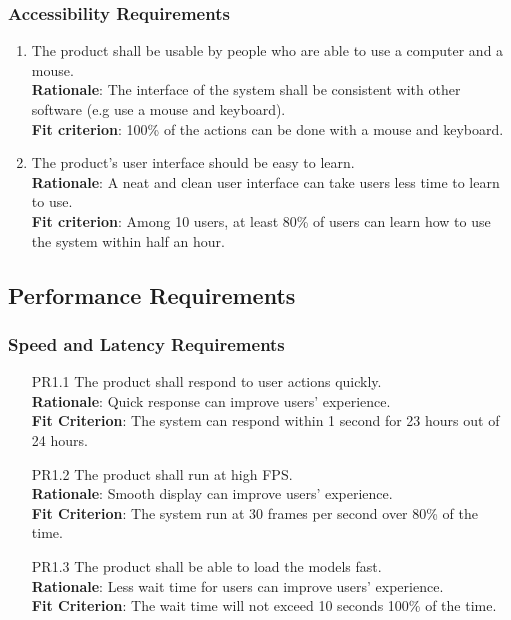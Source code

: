 \documentclass{article}
\begin{document}
\subsubsection{Accessibility Requirements}
\begin{enumerate}[UH5.1]
    \item The product shall be usable by people who are able to use a computer and a mouse.\\
    \textbf{Rationale}: The interface of the system shall be consistent with other software (e.g use a mouse and keyboard).\\
    \textbf{Fit criterion}: 100\% of the actions can be done with a mouse and keyboard.
    
    \item The product's user interface should be easy to learn.\\
    \textbf{Rationale}: A neat and clean user interface can take users less time to learn to use.\\
    \textbf{Fit criterion}: Among 10 users, at least 80\% of users can learn how to use the system within half an hour.
\end{enumerate}
\subsection{Performance Requirements}
\subsubsection{Speed and Latency Requirements}
\begin{enumerate}
    \item[PR1.1] The product shall respond to user actions quickly.\\
    \textbf{Rationale}: Quick response can improve users' experience.\\
    \textbf{Fit Criterion}: The system can respond within 1 second for 23 hours out of 24 hours.
    
    \item[PR1.2] The product shall run at high FPS.\\
    \textbf{Rationale}: Smooth display can improve users' experience.\\
    \textbf{Fit Criterion}: The system run at 30 frames per second over 80\% of the time.
    
    \item[PR1.3] The product shall be able to load the models fast.\\
    \textbf{Rationale}: Less wait time for users can improve users' experience.\\
    \textbf{Fit Criterion}: The wait time will not exceed 10 seconds 100\% of the time.
\end{enumerate}
\end{document}
